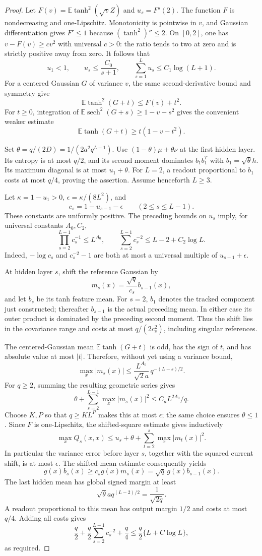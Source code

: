 \begin{proof}
Let $F(v)=\mathbb E\tanh^2(\sqrt vZ)$ and $u_s=F^s(2)$.
The function $F$ is nondecreasing and one-Lipschitz. Monotonicity is
pointwise in $v$, and Gaussian differentiation gives $F'\le1$ because
$(\tanh^2)''\le2$. On $[0,2]$, one has $v-F(v)\ge cv^2$ with
universal $c>0$: the ratio tends to two at zero and is strictly
positive away from zero. It follows that
\[
 u_1<1,\qquad u_s\le\frac{C_0}{s+1},\qquad
 \sum_{s=1}^L u_s\le C_1\log(L+1).
\]
For a centered Gaussian $G$ of variance $v$, the same second-derivative
bound and symmetry give
\[
 \mathbb E\tanh^2(G+t)\le F(v)+t^2.
\]
For $t\ge0$, integration of
$\mathbb E\operatorname{sech}^2(G+s)\ge1-v-s^2$ gives the convenient
weaker estimate
\[
 \mathbb E\tanh(G+t)\ge t(1-v-t^2).
\]

Set $\theta=q/(2D)=1/(2a^2q^{L-1})$.
Use $(1-\theta)\mu+\theta\nu$ at the first hidden layer. Its entropy
is at most $q/2$, and its second moment dominates $b_1b_1^T$ with
$b_1=\sqrt\theta h$. Its maximum diagonal is at most $u_1+\theta$.
For $L=2$, a readout proportional to $b_1$ costs at most $q/4$,
proving the assertion. Assume henceforth $L\ge3$.

Let $\kappa=1-u_1>0$, $\epsilon=\kappa/(8L^2)$, and
\[
 c_s=1-u_{s-1}-\epsilon\qquad(2\le s\le L-1).
\]
These constants are uniformly positive. The preceding bounds on $u_s$
imply, for universal constants $A_0,C_2$,
\[
 \prod_{s=2}^{L-1}c_s^{-1}\le L^{A_0},\qquad
 \sum_{s=2}^{L-1}c_s^{-2}\le L-2+C_2\log L.
\]
Indeed, $-\log c_s$ and $c_s^{-2}-1$ are both at most a universal
multiple of $u_{s-1}+\epsilon$.

At hidden layer $s$, shift the reference Gaussian by
\[
 m_s(x)=\frac{\sqrt q}{c_s}b_{s-1}(x),
\]
and let $b_s$ be its tanh feature mean. For $s=2$, $b_1$ denotes
the tracked component just constructed; thereafter $b_{s-1}$ is the
actual preceding mean. In either case its outer product is dominated
by the preceding second moment. Thus the shift lies in the covariance
range and costs at most $q/(2c_s^2)$, including singular references.

The centered-Gaussian mean $\mathbb E\tanh(G+t)$ is odd, has the sign
of $t$, and has absolute value at most $|t|$. Therefore, without yet
using a variance bound,
\[
 \max_x|m_s(x)|
 \le\frac{L^{A_0}}{\sqrt2a}\,q^{-(L-s)/2}.
\]
For $q\ge2$, summing the resulting geometric series gives
\[
 \theta+\sum_{s=2}^{L-1}\max_x|m_s(x)|^2
 \le C_a L^{2A_0}/q.
\]
Choose $K,P$ so that $q\ge KL^P$ makes this at most $\epsilon$;
the same choice ensures $\theta\le1$.
Since $F$ is one-Lipschitz, the shifted-square estimate gives inductively
\[
 \max_x Q_s(x,x)
 \le u_s+\theta+\sum_{t=2}^s\max_x|m_t(x)|^2.
\]
In particular the variance error before layer $s$, together with the
squared current shift, is at most $\epsilon$.
The shifted-mean estimate consequently yields
\[
 g(x)b_s(x)\ge c_s g(x)m_s(x)
             =\sqrt q\,g(x)b_{s-1}(x).
\]
The last hidden mean has global signed margin at least
\[
 \sqrt\theta a q^{(L-2)/2}=\frac1{\sqrt{2q}}.
\]
A readout proportional to this mean has output margin $1/2$ and costs
at most $q/4$. Adding all costs gives
\[
 \frac q2+\frac q2\sum_{s=2}^{L-1}c_s^{-2}+\frac q4
 \le\frac q2\{L+C\log L\},
\]
as required.
\end{proof}

